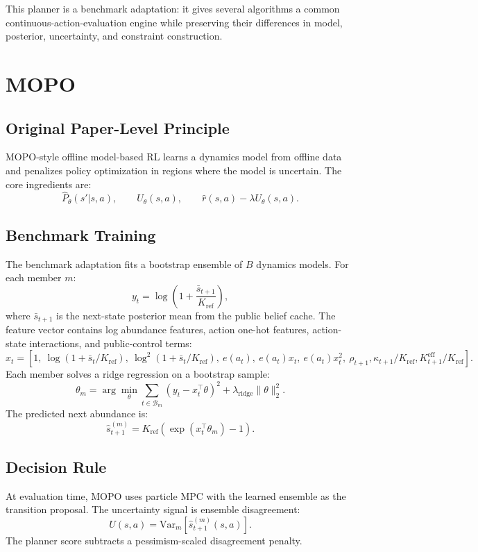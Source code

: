 \documentclass[11pt]{article}
\newcommand{\Var}{\mathrm{Var}}
\newcommand{\1}{\mathbf{1}}
\begin{document}
This planner is a benchmark adaptation: it gives several algorithms a common
continuous-action-evaluation engine while preserving their differences in model,
posterior, uncertainty, and constraint construction.

\section{MOPO}

\subsection{Original Paper-Level Principle}

MOPO-style offline model-based RL learns a dynamics model from offline data and
penalizes policy optimization in regions where the model is uncertain.  The core
ingredients are:
\[
  \hat{P}_\theta(s'|s,a),\qquad
  U_\theta(s,a),\qquad
  \hat{r}(s,a)-\lambda U_\theta(s,a).
\]

\subsection{Benchmark Training}

The benchmark adaptation fits a bootstrap ensemble of $B$ dynamics models.  For
each member $m$:
\[
  y_t=\log\left(1+\frac{\bar{s}_{t+1}}{K_{\mathrm{ref}}}\right),
\]
where $\bar{s}_{t+1}$ is the next-state posterior mean from the public belief
cache.  The feature vector contains log abundance features, action one-hot
features, action-state interactions, and public-control terms:
\[
  x_t =
  \left[
  1,\ \log(1+\bar{s}_t/K_{\mathrm{ref}}),\
  \log^2(1+\bar{s}_t/K_{\mathrm{ref}}),\
  e(a_t),\ e(a_t)x_t,\ e(a_t)x_t^2,\
  \rho_{t+1},\kappa_{t+1}/K_{\mathrm{ref}},K^{\mathrm{eff}}_{t+1}/K_{\mathrm{ref}}
  \right].
\]
Each member solves a ridge regression on a bootstrap sample:
\[
  \theta_m =
  \arg\min_\theta \sum_{t\in\mathcal{B}_m}(y_t-x_t^\top\theta)^2
  +\lambda_{\mathrm{ridge}}\|\theta\|_2^2.
\]
The predicted next abundance is:
\[
  \hat{s}_{t+1}^{(m)}
  =
  K_{\mathrm{ref}}\left(\exp(x_t^\top\theta_m)-1\right).
\]

\subsection{Decision Rule}

At evaluation time, MOPO uses particle MPC with the learned ensemble as the
transition proposal.  The uncertainty signal is ensemble disagreement:
\[
  U(s,a)=\Var_m[\hat{s}^{(m)}_{t+1}(s,a)].
\]
The planner score subtracts a pessimism-scaled disagreement penalty.
\end{document}
